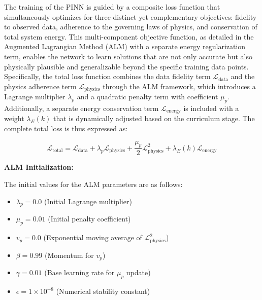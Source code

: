 \documentclass{article}
\begin{document}
The training of the PINN is guided by a composite loss function that simultaneously optimizes for three distinct yet complementary objectives: 
fidelity to observed data, adherence to the governing laws of physics, and conservation of total system energy.
This multi-component objective function, 
as detailed in the Augmented Lagrangian Method (ALM) with a separate energy regularization term, enables the network to learn solutions that are not only accurate 
but also physically plausible and generalizable beyond the specific training data points.
Specifically, the total loss function combines the data fidelity term $\mathcal{L}_{\text{data}}$ and the physics adherence term $\mathcal{L}_{\text{physics}}$ 
through the ALM framework, which introduces a Lagrange multiplier $\lambda_p$ and a quadratic penalty term with coefficient $\mu_p$.
Additionally, a separate energy conservation term $\mathcal{L}_{\text{energy}}$ is included with a weight $\lambda_E(k)$ that is dynamically 
adjusted based on the curriculum stage.
The complete total loss is thus expressed as:

\begin{equation}
\mathcal{L}_{\text{total}} = \mathcal{L}_{\text{data}} + \lambda_p \mathcal{L}_{\text{physics}} + \frac{\mu_p}{2} \mathcal{L}_{\text{physics}}^2 + \lambda_E(k) \mathcal{L}_{\text{energy}}
\end{equation}


\textbf{ALM Initialization:}

The initial values for the ALM parameters are as follows:

\begin{itemize}
    \item $\lambda_p = 0.0$ \hspace{1em} (Initial Lagrange multiplier)
    \item $\mu_p = 0.01$ \hspace{1em} (Initial penalty coefficient)
    \item $v_p = 0.0$ \hspace{1em} (Exponential moving average of $\mathcal{L}_{\text{physics}}^2$)
    \item $\beta = 0.99$ \hspace{1em} (Momentum for $v_p$)
    \item $\gamma = 0.01$ \hspace{1em} (Base learning rate for $\mu_p$ update)
    \item $\epsilon = 1 \times 10^{-8}$ \hspace{1em} (Numerical stability constant)
\end{itemize}
\end{document}
